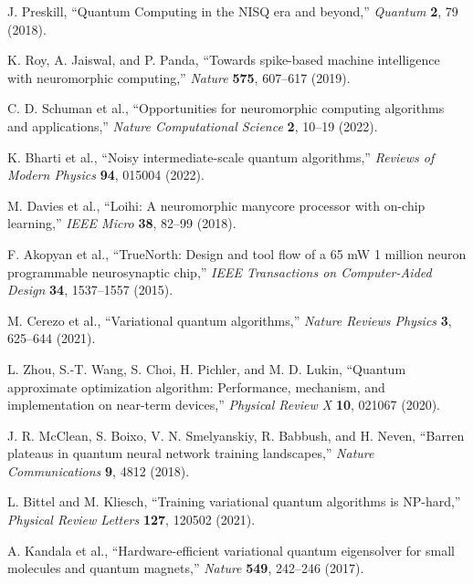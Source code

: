 \documentclass[arxiv,final,oneside,onecolumn]{arxiv-preprint-simple}
\begin{document}

\begin{thebibliography}{99}

J. Preskill,
``Quantum Computing in the NISQ era and beyond,''
\textit{Quantum} \textbf{2}, 79 (2018).

K. Roy, A. Jaiswal, and P. Panda,
``Towards spike-based machine intelligence with neuromorphic computing,''
\textit{Nature} \textbf{575}, 607--617 (2019).

C. D. Schuman et al.,
``Opportunities for neuromorphic computing algorithms and applications,''
\textit{Nature Computational Science} \textbf{2}, 10--19 (2022).

K. Bharti et al.,
``Noisy intermediate-scale quantum algorithms,''
\textit{Reviews of Modern Physics} \textbf{94}, 015004 (2022).

M. Davies et al.,
``Loihi: A neuromorphic manycore processor with on-chip learning,''
\textit{IEEE Micro} \textbf{38}, 82--99 (2018).

F. Akopyan et al.,
``TrueNorth: Design and tool flow of a 65 mW 1 million neuron programmable neurosynaptic chip,''
\textit{IEEE Transactions on Computer-Aided Design} \textbf{34}, 1537--1557 (2015).

M. Cerezo et al.,
``Variational quantum algorithms,''
\textit{Nature Reviews Physics} \textbf{3}, 625--644 (2021).

L. Zhou, S.-T. Wang, S. Choi, H. Pichler, and M. D. Lukin,
``Quantum approximate optimization algorithm: Performance, mechanism, and implementation on near-term devices,''
\textit{Physical Review X} \textbf{10}, 021067 (2020).

J. R. McClean, S. Boixo, V. N. Smelyanskiy, R. Babbush, and H. Neven,
``Barren plateaus in quantum neural network training landscapes,''
\textit{Nature Communications} \textbf{9}, 4812 (2018).

L. Bittel and M. Kliesch,
``Training variational quantum algorithms is NP-hard,''
\textit{Physical Review Letters} \textbf{127}, 120502 (2021).

A. Kandala et al.,
``Hardware-efficient variational quantum eigensolver for small molecules and quantum magnets,''
\textit{Nature} \textbf{549}, 242--246 (2017).


\end{thebibliography}
\end{document}
